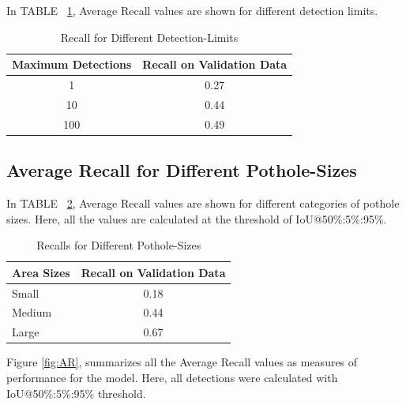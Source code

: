 \documentclass[conference]{IEEEtran}
\begin{document}
In TABLE ~\ref{tab:recall_limits}, Average Recall values are shown for different detection limits.
\begin{table}[h]
  \centering
  \caption{Recall for Different Detection-Limits}
  \label{tab:recall_limits}
  \renewcommand{\arraystretch}{1.3}
  \begin{tabular}{c||c} 
    \bfseries{Maximum Detections} & \bfseries{Recall on Validation Data} \\\hline\hline
    1                             & 0.27                                 \\\hline
    10                            & 0.44                                 \\\hline
    100                           & 0.49                                 \\\hline
  \end{tabular}
\end{table}
    
\subsection{Average Recall for Different Pothole-Sizes}
In TABLE ~\ref{tab:recall_sizes}, Average Recall values are shown for different categories of pothole sizes. Here, all the values are calculated at the threshold of IoU@50\%:5\%:95\%.
    
\begin{table}[h]
  \centering
  \caption{Recalls for Different Pothole-Sizes}
  \label{tab:recall_sizes}
  \renewcommand{\arraystretch}{1.3}
  \begin{tabular}{l||c}
    \bfseries{Area Sizes} & \bfseries{Recall on Validation Data} \\\hline\hline
    Small                 & 0.18                                 \\\hline
    Medium                & 0.44                                 \\\hline
    Large                 & 0.67                                 \\\hline
  \end{tabular}
\end{table} 
    
Figure \ref{fig:AR}, summarizes all the Average Recall values as measures of performance for the model. Here, all detections were calculated with IoU@50\%:5\%:95\% threshold.
    
\end{document}
